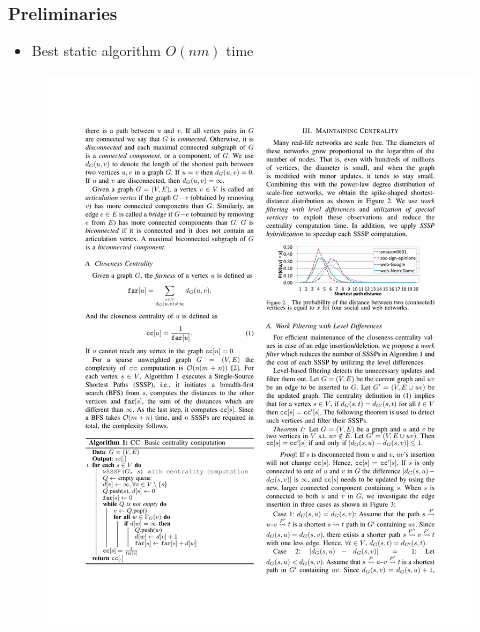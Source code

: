 \begin{frame}
  \frametitle{Preliminaries}

  \begin{itemize}
    \item Best static algorithm $O(nm)$ time
  \end{itemize}

  \begin{figure}[H]
    \centering
    \includegraphics[width=\textwidth, height=0.7\textheight, keepaspectratio]{imgs/sksc-algo1}
  \end{figure}
\end{frame}



